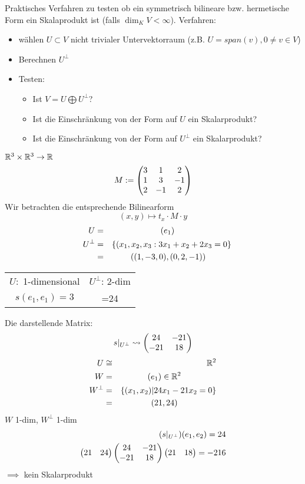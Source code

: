\begin{Eig}
  Praktisches Verfahren zu testen ob ein symmetrisch bilineare bzw. hermetische Form ein Skalaprodukt ist (falls $\dim_KV<\infty$). Verfahren:
  \begin{itemize}
    \item wählen $U\subset V$ nicht trivialer Untervektorraum (z.B. $U=span(v), 0 \neq v\in V$)
    \item Berechnen $U^\perp$
    \item Testen:
      \begin{itemize}
        \item Ist $V=U\bigoplus U^\perp$?
        \item Ist die Einschränkung von der Form auf $U$ ein Skalarprodukt? 
        \item Ist die Einschränkung von der Form auf $U^\perp$ ein Skalarprodukt?
      \end{itemize}
  \end{itemize}
\end{Eig}
\begin{Bsp}
  $\mathbb{R}^3\times\mathbb{R}^3\to\mathbb{R}$
  \begin{align*}
    M:=\begin{pmatrix}3&1&2\\
    1&3&-1\\
    2&-1&2\end{pmatrix}
  \end{align*}
  Wir betrachten die entsprechende Bilinearform
  \[(x,y)\mapsto t_x\cdot M \cdot y\]
  \begin{align*}
    U&=& \span(e_1)\\
    U^\perp&=& \left\{ (x_1,x_2,x_3 :3x_1+x_2+2x_3=0\right\}\\
    &=& \span\left( (1,-3,0),(0,2,-1) \right)
  \end{align*}
  \begin{table}
    \centering
    \begin{tabular}{c|c}
      $U:$ 1-dimensional & $U^\perp$: 2-dim\\
      $s(e_1,e_1)=3$ & =24
    \end{tabular}
  \end{table}
  Die darstellende Matrix:
  \[s|_{U^\perp}\rightsquigarrow \begin{pmatrix}24&-21\\-21&18\end{pmatrix}\]
  \begin{align*}
    U &\cong& \mb{R}^2\\
    W&=&\span(e_1)\in\mb{R}^2\\
    W^\perp&=&\left\{ (x_1,x_2)|24x_1-21x_2=0 \right\}\\
    &=& \span(21,24)\\
  \end{align*}
  $W$ 1-dim, $W^\perp$ 1-dim\\
  \begin{align*}
    (s|_{U^\perp})(e_1,e_2)=24\\
    \begin{pmatrix}21&24\end{pmatrix}\begin{pmatrix}24&-21\\-21&18\end{pmatrix}\begin{pmatrix}21&18\end{pmatrix}=-216
  \end{align*}
  $\implies$ kein Skalarprodukt
\end{Bsp}
